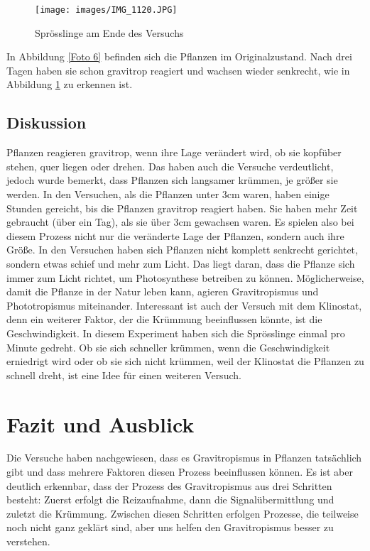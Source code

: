 \documentclass[
a4paper, 
11pt, 
ngerman,
listof=totoc,
bibliography=totocnumbered,
abstracton
]{scrreprt}
\begin{document}
\begin{figure}[H]
	\centering 
	\texttt{[image: images/IMG\_1120.JPG]}
	\caption{Sprösslinge am Ende des Versuchs \label{Foto 7}}
\end{figure} 

In Abbildung \ref{Foto 6} befinden sich die Pflanzen im Originalzustand. Nach drei Tagen haben sie schon gravitrop reagiert und wachsen wieder senkrecht, wie in Abbildung \ref{Foto 7} zu erkennen ist.


\section{Diskussion}

Pflanzen reagieren gravitrop, wenn ihre Lage verändert wird, ob sie kopfüber stehen, quer liegen oder drehen. Das haben auch die Versuche verdeutlicht, jedoch wurde bemerkt, dass Pflanzen sich langsamer krümmen, je größer sie werden. In den Versuchen, als die Pflanzen unter 3cm waren, haben einige Stunden gereicht, bis die Pflanzen gravitrop reagiert haben. Sie haben mehr Zeit gebraucht (über ein Tag), als sie über 3cm gewachsen waren. Es spielen also bei diesem Prozess nicht nur die veränderte Lage der Pflanzen, sondern auch ihre Größe. 
In den Versuchen haben sich Pflanzen nicht komplett senkrecht gerichtet, sondern etwas schief und mehr zum Licht. Das liegt daran, dass die Pflanze sich immer zum Licht richtet, um Photosynthese betreiben zu können. Möglicherweise, damit die Pflanze in der Natur leben kann, agieren Gravitropismus und Phototropismus miteinander.
Interessant ist auch der Versuch mit dem Klinostat, denn ein weiterer Faktor, der die Krümmung beeinflussen könnte, ist die Geschwindigkeit. In diesem Experiment haben sich die Sprösslinge einmal pro Minute gedreht. Ob sie sich schneller krümmen, wenn die Geschwindigkeit erniedrigt wird oder ob sie sich nicht krümmen, weil der Klinostat die Pflanzen zu schnell dreht, ist eine Idee für einen weiteren Versuch.
 


\chapter{Fazit und Ausblick}

Die Versuche haben nachgewiesen, dass es Gravitropismus in Pflanzen tatsächlich gibt und dass mehrere Faktoren diesen Prozess beeinflussen können. Es ist aber deutlich erkennbar, dass der Prozess des Gravitropismus aus drei Schritten besteht: Zuerst erfolgt die Reizaufnahme, dann die Signalübermittlung und zuletzt die Krümmung. Zwischen diesen Schritten erfolgen Prozesse, die teilweise noch nicht ganz geklärt sind, aber uns helfen den Gravitropismus besser zu verstehen. 
\end{document}
